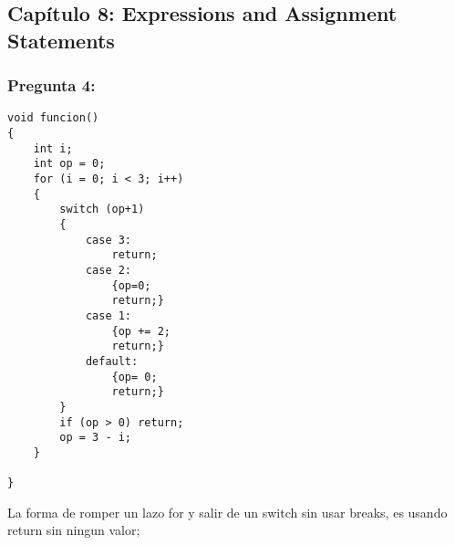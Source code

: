 \documentclass[11pt]{article}
\begin{document}
\subsection{Capítulo 8: Expressions and Assignment Statements}
\subsubsection{Pregunta 4:}
\begin{lstlisting}[frame=single] 
void funcion()
{
	int i;
	int op = 0;
	for (i = 0; i < 3; i++) 
	{
		switch (op+1) 
		{
			case 3:
				return;
			case 2: 
				{op=0; 
				return;}
			case 1:
				{op += 2; 
				return;}
			default:
				{op= 0;
				return;}
		}
		if (op > 0) return;
		op = 3 - i;
	}

}
\end{lstlisting}
La forma de romper un lazo for y salir de un switch sin usar breaks, es usando return sin ningun valor;




        
\end{document}
